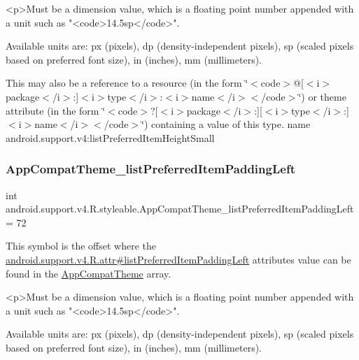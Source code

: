 \begin{DoxyVerb}      <p>Must be a dimension value, which is a floating point number appended with a unit such as "<code>14.5sp</code>".
\end{DoxyVerb}
 Available units are\+: px (pixels), dp (density-\/independent pixels), sp (scaled pixels based on preferred font size), in (inches), mm (millimeters). 

This may also be a reference to a resource (in the form \char`\"{}$<$code$>$@\mbox{[}$<$i$>$package$<$/i$>$\+:\mbox{]}$<$i$>$type$<$/i$>$\+:$<$i$>$name$<$/i$>$$<$/code$>$\char`\"{}) or theme attribute (in the form \char`\"{}$<$code$>$?\mbox{[}$<$i$>$package$<$/i$>$\+:\mbox{]}\mbox{[}$<$i$>$type$<$/i$>$\+:\mbox{]}$<$i$>$name$<$/i$>$$<$/code$>$\char`\"{}) containing a value of this type.  name android.\+support.\+v4\+:list\+Preferred\+Item\+Height\+Small \mbox{\label{classandroid_1_1support_1_1v4_1_1R_1_1styleable_ae536509d1f248feded607e1588900608}} 
\subsubsection{\texorpdfstring{App\+Compat\+Theme\+\_\+list\+Preferred\+Item\+Padding\+Left}{AppCompatTheme\_listPreferredItemPaddingLeft}}
{\footnotesize\ttfamily int android.\+support.\+v4.\+R.\+styleable.\+App\+Compat\+Theme\+\_\+list\+Preferred\+Item\+Padding\+Left = 72\hspace{0.3cm}{\ttfamily [static]}}

This symbol is the offset where the \hyperlink{classandroid_1_1support_1_1v4_1_1R_1_1attr_a9a8582bc6e567f1987e92f27316b6abf}{android.\+support.\+v4.\+R.\+attr\#list\+Preferred\+Item\+Padding\+Left} attribute\textquotesingle{}s value can be found in the \hyperlink{classandroid_1_1support_1_1v4_1_1R_1_1styleable_ac07ebbe62ed977f6dcaadc6397840ace}{App\+Compat\+Theme} array.

\begin{DoxyVerb}      <p>Must be a dimension value, which is a floating point number appended with a unit such as "<code>14.5sp</code>".
\end{DoxyVerb}
 Available units are\+: px (pixels), dp (density-\/independent pixels), sp (scaled pixels based on preferred font size), in (inches), mm (millimeters). 

